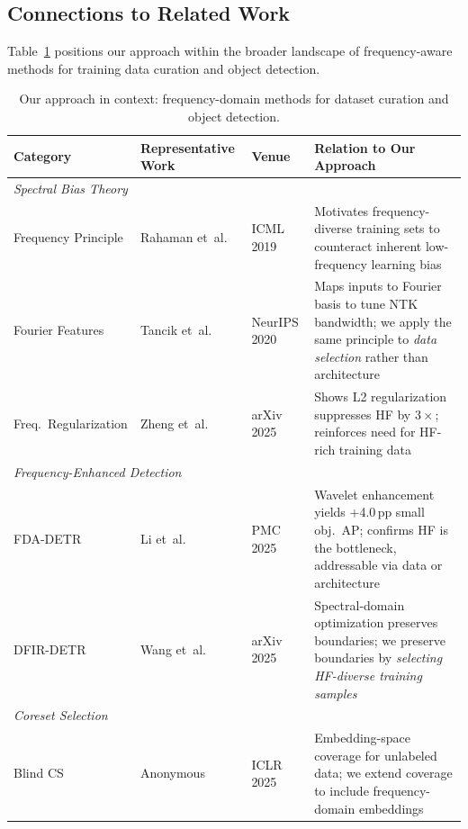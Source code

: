 \subsection{Connections to Related Work}
\label{sec:fourier_connections}

Table~\ref{tab:related_work} positions our approach within the broader
landscape of frequency-aware methods for training data curation and object
detection.

\begin{table}[t]
\centering
\caption{Our approach in context: frequency-domain methods for dataset
         curation and object detection.}
\label{tab:related_work}
\begin{tabular}{p{3.2cm}p{2.5cm}p{3cm}p{5.5cm}}
\toprule
\textbf{Category} & \textbf{Representative Work} & \textbf{Venue} &
    \textbf{Relation to Our Approach} \\
\midrule
\multicolumn{4}{l}{\textit{Spectral Bias Theory}} \\
\quad Frequency Principle
    & Rahaman et~al.
    & ICML 2019
    & Motivates frequency-diverse training sets to counteract inherent
      low-frequency learning bias \\[3pt]
\quad Fourier Features
    & Tancik et~al.
    & NeurIPS 2020
    & Maps inputs to Fourier basis to tune NTK bandwidth; we apply the
      same principle to \emph{data selection} rather than architecture \\[3pt]
\quad Freq.\ Regularization
    & Zheng et~al.
    & arXiv 2025
    & Shows L2 regularization suppresses HF by $3\times$; reinforces
      need for HF-rich training data \\[3pt]
\midrule
\multicolumn{4}{l}{\textit{Frequency-Enhanced Detection}} \\
\quad FDA-DETR
    & Li et~al.
    & PMC 2025
    & Wavelet enhancement yields +4.0\,pp small obj.\ AP; confirms HF
      is the bottleneck, addressable via data or architecture \\[3pt]
\quad DFIR-DETR
    & Wang et~al.
    & arXiv 2025
    & Spectral-domain optimization preserves boundaries; we preserve
      boundaries by \emph{selecting HF-diverse training samples} \\[3pt]
\midrule
\multicolumn{4}{l}{\textit{Coreset Selection}} \\
\quad Blind CS
    & Anonymous
    & ICLR 2025
    & Embedding-space coverage for unlabeled data; we extend coverage
      to include frequency-domain embeddings \\[3pt]

\end{tabular}
\end{table}
